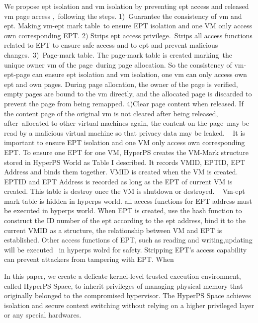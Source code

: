 We propose ept isolation and vm isolation by preventing ept access and released vm page access , following the steps. 1) Guarantee the consistency of vm and ept. Making vm-ept mark table to ensure EPT isolation and one VM only access own corresponding EPT. 2) Strips ept access privilege. Strips all access functions related to EPT to ensure safe access and to ept and prevent malicious changes. 3) Page-mark table. The page-mark table is created marking the unique owner vm of the page during page allocation. So the consistency of vm-ept-page can ensure ept isolation and vm isolation, one vm can only access own ept and own pages. During page allocation, the owner of the page is verified, empty pages are bound to the vm directly, and the allocated page is discarded to prevent the page from being remapped. 4)Clear page content when released. If the content page of the original vm is not cleared after being released, after allocated to other virtual machines again, the content on the page may be read by a malicious virtual machine so that privacy data may be leaked.
 
It is important to ensure EPT isolation and one VM only access own corresponding EPT. To ensure one EPT for one VM, HyperPS creates the VM-Mark structure stored in HyperPS World as Table I described. It records VMID, EPTID, EPT Address and binds them together. VMID is created when the VM is created. EPTID and EPT Address is recorded as long as the EPT of current VM is created. This table is destroy once the VM is shutdown or destroyed.
 
Vm-ept mark table is hidden in hyperps world. all access functions for EPT address must be executed in hyperps world. When EPT is created, use the hash function to construct the ID number of the ept according to the ept address, bind it to the current VMID as a structure, the relationship between VM and EPT is established. Other access functions of EPT, such as reading and writing,updating will be executed  in hyperps wolrd for safety.
Stripping EPT's access capability can prevent attackers from tampering with EPT. When 
\fi


In this paper, we create a delicate kernel-level trusted execution environment, called HyperPS Space, to inherit privileges of managing physical memory that originally belonged to the compromised hypervisor. 
The HyperPS Space achieves isolation and secure context switching without relying on a higher privileged layer or any special hardwares. 

